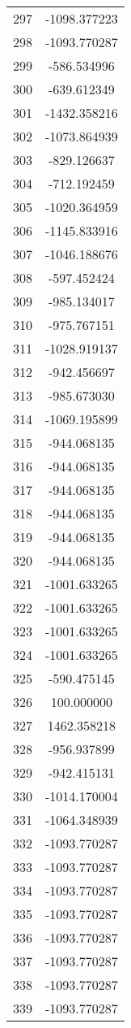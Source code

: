 \documentclass[12pt]{article}
\begin{document}
\begin{longtable}{@{}cc@{}}
297 & -1098.377223 \\
298 & -1093.770287 \\
299 & -586.534996 \\
300 & -639.612349 \\
301 & -1432.358216 \\
302 & -1073.864939 \\
303 & -829.126637 \\
304 & -712.192459 \\
305 & -1020.364959 \\
306 & -1145.833916 \\
307 & -1046.188676 \\
308 & -597.452424 \\
309 & -985.134017 \\
310 & -975.767151 \\
311 & -1028.919137 \\
312 & -942.456697 \\
313 & -985.673030 \\
314 & -1069.195899 \\
315 & -944.068135 \\
316 & -944.068135 \\
317 & -944.068135 \\
318 & -944.068135 \\
319 & -944.068135 \\
320 & -944.068135 \\
321 & -1001.633265 \\
322 & -1001.633265 \\
323 & -1001.633265 \\
324 & -1001.633265 \\
325 & -590.475145 \\
326 & 100.000000 \\
327 & 1462.358218 \\
328 & -956.937899 \\
329 & -942.415131 \\
330 & -1014.170004 \\
331 & -1064.348939 \\
332 & -1093.770287 \\
333 & -1093.770287 \\
334 & -1093.770287 \\
335 & -1093.770287 \\
336 & -1093.770287 \\
337 & -1093.770287 \\
338 & -1093.770287 \\
339 & -1093.770287 \\

\end{longtable}
\end{document}
